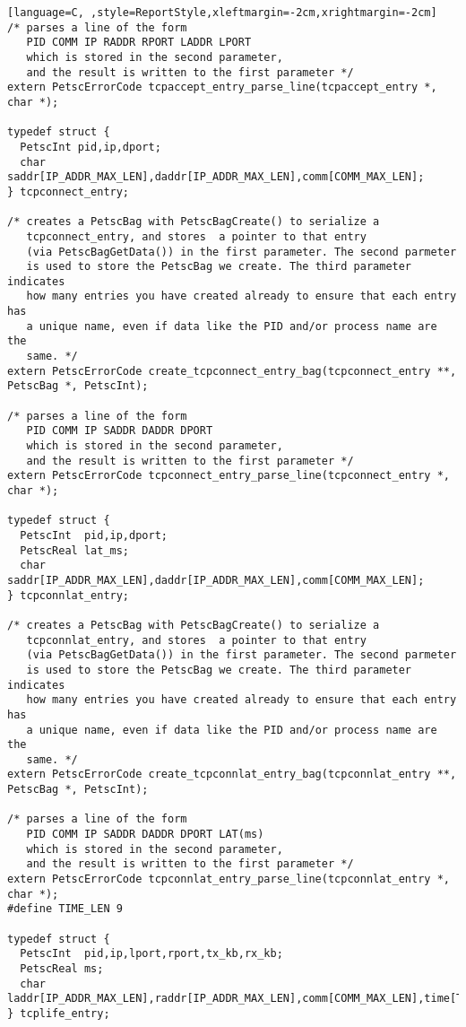 \documentclass[11pt]{article}
\begin{document}
\begin{lstlisting}[language=C, ,style=ReportStyle,xleftmargin=-2cm,xrightmargin=-2cm]
/* parses a line of the form 
   PID COMM IP RADDR RPORT LADDR LPORT
   which is stored in the second parameter, 
   and the result is written to the first parameter */
extern PetscErrorCode tcpaccept_entry_parse_line(tcpaccept_entry *, char *);

typedef struct {
  PetscInt pid,ip,dport;
  char     saddr[IP_ADDR_MAX_LEN],daddr[IP_ADDR_MAX_LEN],comm[COMM_MAX_LEN];
} tcpconnect_entry;

/* creates a PetscBag with PetscBagCreate() to serialize a
   tcpconnect_entry, and stores  a pointer to that entry
   (via PetscBagGetData()) in the first parameter. The second parmeter
   is used to store the PetscBag we create. The third parameter indicates
   how many entries you have created already to ensure that each entry has
   a unique name, even if data like the PID and/or process name are the 
   same. */
extern PetscErrorCode create_tcpconnect_entry_bag(tcpconnect_entry **, PetscBag *, PetscInt);

/* parses a line of the form 
   PID COMM IP SADDR DADDR DPORT
   which is stored in the second parameter, 
   and the result is written to the first parameter */
extern PetscErrorCode tcpconnect_entry_parse_line(tcpconnect_entry *, char *);

typedef struct {
  PetscInt  pid,ip,dport;
  PetscReal lat_ms;
  char      saddr[IP_ADDR_MAX_LEN],daddr[IP_ADDR_MAX_LEN],comm[COMM_MAX_LEN];
} tcpconnlat_entry;

/* creates a PetscBag with PetscBagCreate() to serialize a
   tcpconnlat_entry, and stores  a pointer to that entry
   (via PetscBagGetData()) in the first parameter. The second parmeter
   is used to store the PetscBag we create. The third parameter indicates
   how many entries you have created already to ensure that each entry has
   a unique name, even if data like the PID and/or process name are the 
   same. */
extern PetscErrorCode create_tcpconnlat_entry_bag(tcpconnlat_entry **, PetscBag *, PetscInt);

/* parses a line of the form 
   PID COMM IP SADDR DADDR DPORT LAT(ms)
   which is stored in the second parameter, 
   and the result is written to the first parameter */
extern PetscErrorCode tcpconnlat_entry_parse_line(tcpconnlat_entry *, char *);
#define TIME_LEN 9

typedef struct {
  PetscInt  pid,ip,lport,rport,tx_kb,rx_kb;
  PetscReal ms;
  char      laddr[IP_ADDR_MAX_LEN],raddr[IP_ADDR_MAX_LEN],comm[COMM_MAX_LEN],time[TIME_LEN];
} tcplife_entry;


\end{lstlisting}
\end{document}

